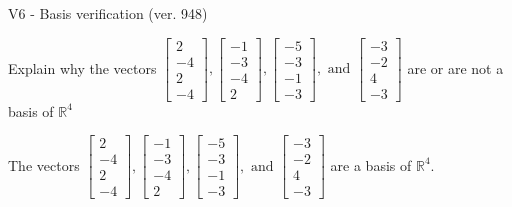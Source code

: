\begin{exercise}
  \begin{exerciseTitle}V6 - Basis verification (ver. 948)\end{exerciseTitle}
  \begin{exerciseStatement}
    Explain why the vectors \(\left[\begin{array}{r}
2 \\
-4 \\
2 \\
-4
\end{array}\right] , \left[\begin{array}{r}
-1 \\
-3 \\
-4 \\
2
\end{array}\right] , \left[\begin{array}{r}
-5 \\
-3 \\
-1 \\
-3
\end{array}\right] , \text{ and } \left[\begin{array}{r}
-3 \\
-2 \\
4 \\
-3
\end{array}\right]\) are or are not a basis of \(\mathbb{R}^4\)	


  \end{exerciseStatement}
  \begin{exerciseAnswer}
   The vectors \(\left[\begin{array}{r}
2 \\
-4 \\
2 \\
-4
\end{array}\right] , \left[\begin{array}{r}
-1 \\
-3 \\
-4 \\
2
\end{array}\right] , \left[\begin{array}{r}
-5 \\
-3 \\
-1 \\
-3
\end{array}\right] , \text{ and } \left[\begin{array}{r}
-3 \\
-2 \\
4 \\
-3
\end{array}\right]\) 
  	 are  a basis of \(\mathbb{R}^4\).
  


  \end{exerciseAnswer}
\end{exercise}